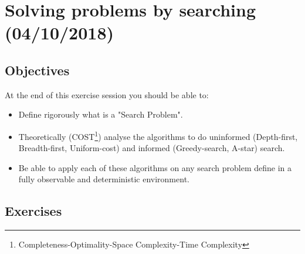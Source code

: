 \documentclass[a4paper, 10pt]{article}
\begin{document}

   \newpage
   \setcounter{page}{1}
   \section{Solving problems by searching (04/10/2018)}
   \subsection{Objectives}
   At the end of this exercise session you should be able to:
   \begin{itemize}
       \item Define rigorously what is a "Search Problem".
       \item Theoretically (COST\footnote{Completeness-Optimality-Space Complexity-Time Complexity}) analyse the algorithms to do uninformed (Depth-first, Breadth-first, Uniform-cost) and informed (Greedy-search, A-star) search.
       \item Be able to apply each of these algorithms on any search problem define in a fully observable and deterministic environment.
   \end{itemize}
   \subsection{Exercises}
\end{document}
